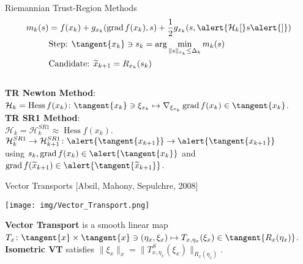 \documentclass{beamer}
\begin{document}
\begin{frame}{Riemannian Trust-Region Methods}
    \vspace{-1.5\baselineskip}
    \begin{align*}
        m_k( s ) & = f(x_k) + g_{x_k}(\operatorname{grad} f(x_k), s ) + \frac{1}{2} g_{x_k}( s , \alert{\mathcal{H}_k [} s \alert{]} ) \\
        & \text{Step: } \tangent{x_k} \ni s_k = \arg \min_{\lVert s \rVert_{x_k} \leq \Delta_k} m_k( s ) \\
        & \text{Candidate: } \widetilde{x}_{k+1} = R_{x_k}(s_k)
    \end{align*} \\[0.7\baselineskip]
    \textbf{TR Newton Method}: \\[0.2\baselineskip]
    $\mathcal{H}_k = \operatorname{Hess} f(x_k) \colon \tangent{x_k} \ni \xi_{x_k} \mapsto \nabla_{\xi_{x_k}} \operatorname{grad} f(x_k) \in \tangent{x_k}$. \\[0.7\baselineskip]
	\textbf{TR SR1 Method}: \\[0.2\baselineskip]
    $\mathcal{H}_k = \mathcal{H}^{SR1}_k \approx \operatorname{Hess} f(x_k)$. \\[0.2\baselineskip]
    $\mathcal{H}^{SR1}_k \rightarrow \mathcal{H}^{SR1}_{k+1} \colon \alert{\tangent{x_{k+1}}} \to \alert{\tangent{x_{k+1}}}$ \\[0.2\baselineskip]
    using $s_k, \operatorname{grad} f(x_k) \in \alert{\tangent{x_k}}$ and $\operatorname{grad}f(\widetilde{x}_{k+1}) \in \alert{\tangent{\widetilde{x}_{k+1}}}$.
\end{frame}

\begin{frame}{Vector Transports}
    \vspace{-1\baselineskip}\hfill{\tiny{[Absil, Mahony, Sepulchre, 2008]}}
    \begin{center}
        \texttt{[image: img/Vector\_Transport.png]}
    \end{center}
    \textbf{Vector Transport} is a smooth linear map $T_x \colon \tangent{x} \times \tangent{x} \ni (\eta_x, \xi_x) \mapsto T_{x, \eta_x}(\xi_x) \in \tangent{R_x(\eta_x)}$. \\[0.5\baselineskip]
    \textbf{Isometric VT} satisfies $\lVert \xi_x \rVert_x = \lVert T^{S}_{x, \eta_x}(\xi_x) \rVert_{R_x(\eta_x)}$.
\end{frame}
\end{document}
